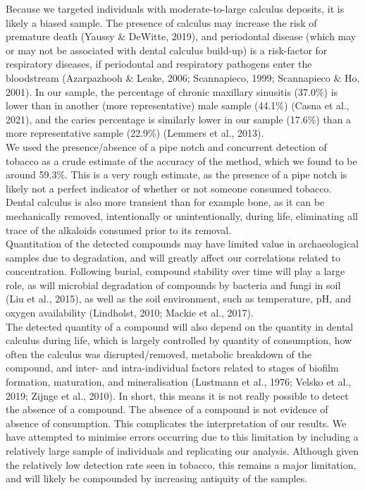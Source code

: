 \documentclass[
]{article}
\begin{document}
Because we targeted individuals with moderate-to-large calculus
deposits, it is likely a biased sample. The presence of calculus may
increase the risk of premature death (Yaussy \& DeWitte, 2019), and
periodontal disease (which may or may not be associated with dental
calculus build-up) is a risk-factor for respiratory diseases, if
periodontal and respiratory pathogens enter the bloodstream (Azarpazhooh
\& Leake, 2006; Scannapieco, 1999; Scannapieco \& Ho, 2001). In our
sample, the percentage of chronic maxillary sinusitis (37.0\%) is lower
than in another (more representative) male sample (44.1\%) (Casna et
al., 2021), and the caries percentage is similarly lower in our sample
(17.6\%) than a more representative sample (22.9\%) (Lemmers et al.,
2013).\\
We used the presence/absence of a pipe notch and concurrent detection of
tobacco as a crude estimate of the accuracy of the method, which we
found to be around 59.3\%. This is a very rough estimate, as the
presence of a pipe notch is likely not a perfect indicator of whether or
not someone consumed tobacco. Dental calculus is also more transient
than for example bone, as it can be mechanically removed, intentionally
or unintentionally, during life, eliminating all trace of the alkaloids
consumed prior to its removal.\\
Quantitation of the detected compounds may have limited value in
archaeological samples due to degradation, and will greatly affect our
correlations related to concentration. Following burial, compound
stability over time will play a large role, as will microbial
degradation of compounds by bacteria and fungi in soil (Liu et al.,
2015), as well as the soil environment, such as temperature, pH, and
oxygen availability (Lindholst, 2010; Mackie et al., 2017).\\
The detected quantity of a compound will also depend on the quantity in
dental calculus during life, which is largely controlled by quantity of
consumption, how often the calculus was disrupted/removed, metabolic
breakdown of the compound, and inter- and intra-individual factors
related to stages of biofilm formation, maturation, and mineralisation
(Lustmann et al., 1976; Velsko et al., 2019; Zijnge et al., 2010). In
short, this means it is not really possible to detect the absence of a
compound. The absence of a compound is not evidence of absence of
consumption. This complicates the interpretation of our results. We have
attempted to minimise errors occurring due to this limitation by
including a relatively large sample of individuals and replicating our
analysis. Although given the relatively low detection rate seen in
tobacco, this remains a major limitation, and will likely be compounded
by increasing antiquity of the samples.
\end{document}
